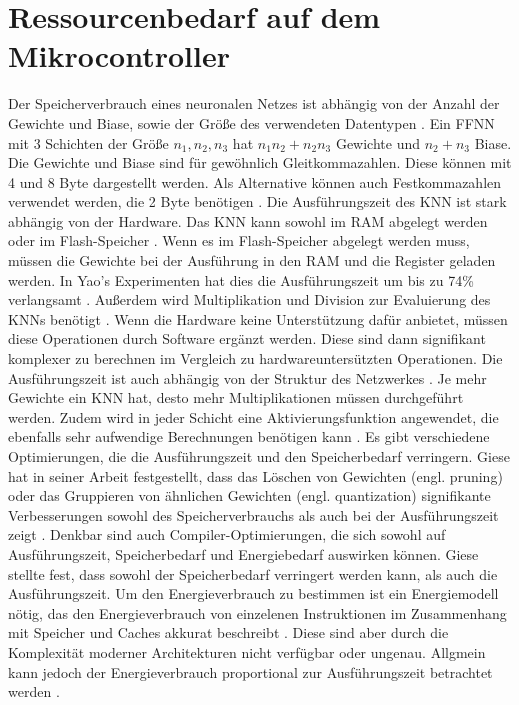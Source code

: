 \section{Ressourcenbedarf auf dem Mikrocontroller}
Der Speicherverbrauch eines neuronalen Netzes ist abhängig von der Anzahl der Gewichte und Biase, sowie der Größe des verwendeten Datentypen \cite{kubikThesis}.
Ein FFNN mit 3 Schichten der Größe $n_1, n_2, n_3$ hat $n_1 n_2 + n_2 n_3$ Gewichte und $n_2 + n_3$ Biase.
Die Gewichte und Biase sind für gewöhnlich Gleitkommazahlen. Diese können mit 4 und 8 Byte dargestellt werden.
Als Alternative können auch Festkommazahlen verwendet werden, die 2 Byte benötigen \cite{gieseThesis}.
\newline
\newline
Die Ausführungszeit des KNN ist stark abhängig von der Hardware.
Das KNN kann sowohl im RAM abgelegt werden oder im Flash-Speicher \cite{engelhardtThesis}.
Wenn es im Flash-Speicher abgelegt werden muss, müssen die Gewichte bei der Ausführung in den RAM und die Register geladen werden.
In Yao's Experimenten hat dies die Ausführungszeit um bis zu 74\% verlangsamt \cite{yaoThesis}.
\newline
\newline
Außerdem wird Multiplikation und Division zur Evaluierung des KNNs benötigt \cite{engelhardtThesis}.
Wenn die Hardware keine Unterstützung dafür anbietet, müssen diese Operationen durch Software ergänzt werden.
Diese sind dann signifikant komplexer zu berechnen im Vergleich zu hardwareuntersützten Operationen.
\newline
\newline
Die Ausführungszeit ist auch abhängig von der Struktur des Netzwerkes \cite{gieseThesis}.
Je mehr Gewichte ein KNN hat, desto mehr Multiplikationen müssen durchgeführt werden.
Zudem wird in jeder Schicht eine Aktivierungsfunktion angewendet, die ebenfalls sehr aufwendige Berechnungen benötigen kann \cite{venzkeArticle}.
\newline
\newline
Es gibt verschiedene Optimierungen, die die Ausführungszeit und den Speicherbedarf verringern.
Giese hat in seiner Arbeit festgestellt, dass das Löschen von Gewichten (engl. pruning) oder das Gruppieren von ähnlichen Gewichten (engl. quantization)
signifikante Verbesserungen sowohl des Speicherverbrauchs als auch bei der Ausführungszeit zeigt \cite{gieseThesis}.
Denkbar sind auch Compiler-Optimierungen, die sich sowohl auf Ausführungszeit, Speicherbedarf und Energiebedarf auswirken können.
Giese stellte fest, dass sowohl der Speicherbedarf verringert werden kann, als auch die Ausführungszeit.
\newline
\newline
Um den Energieverbrauch zu bestimmen ist ein Energiemodell nötig, das den Energieverbrauch von einzelenen Instruktionen
im Zusammenhang mit Speicher und Caches akkurat beschreibt \cite{roth2018measuring}.
Diese sind aber durch die Komplexität moderner Architekturen nicht verfügbar oder ungenau.
Allgmein kann jedoch der Energieverbrauch proportional zur Ausführungszeit betrachtet werden \cite{corral2014can}.